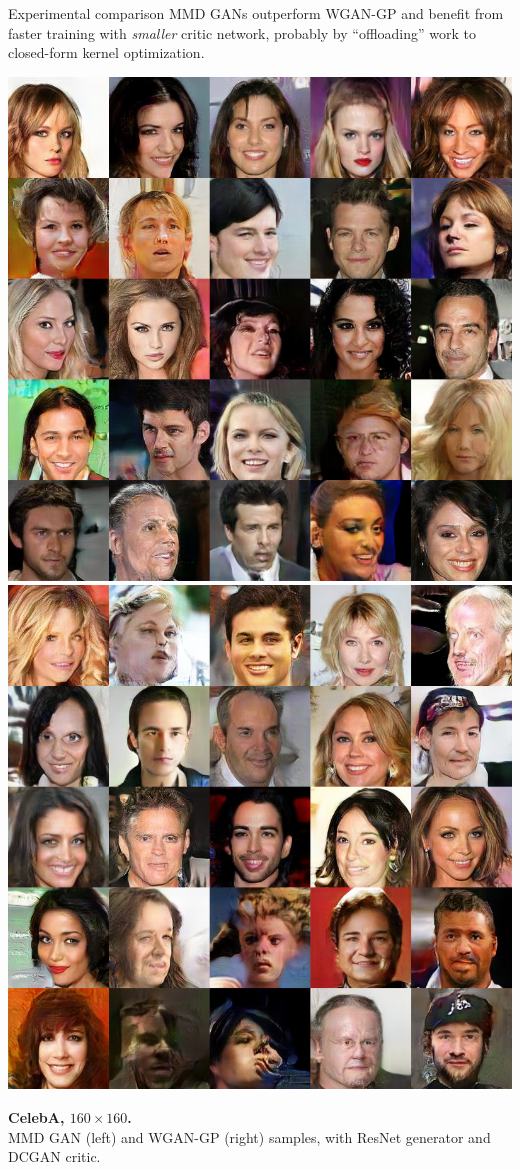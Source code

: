 \documentclass[xcolor={table}]{beamer}
\begin{document}
\begin{frame}{}
\begin{columns}[T, totalwidth=\textwidth]
\begin{column}{.32\textwidth}
    \begin{block}{Experimental comparison}
      MMD GANs outperform WGAN-GP and benefit from faster training with \emph{smaller} critic network,
      probably by ``offloading'' work to closed-form kernel optimization.
    \end{block}
    \vspace*{-1.3cm}

    \begin{minipage}{.6\linewidth}
      \includegraphics[width=.49\linewidth]{samples/celeba-mmd-rq-25.png}
      \includegraphics[width=.49\linewidth]{samples/celeba-wgan-25.png}
    \end{minipage}
    \begin{minipage}{.39\linewidth}
      \textbf{CelebA, $160 \times 160$.} \\
      MMD GAN (left) and WGAN-GP (right) samples,
      with ResNet generator and DCGAN critic.
    \end{minipage}


\end{column}
\end{columns}
\end{frame}
\end{document}
